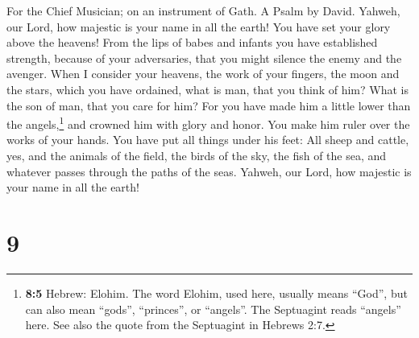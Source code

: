 For the Chief Musician; on an instrument of Gath. A Psalm by David.
 Yahweh, our Lord, how majestic is your name in all the
earth! You have set your glory above the heavens!  From
the lips of babes and infants you have established strength, because of
your adversaries, that you might silence the enemy and the avenger.
 When I consider your heavens, the work of your fingers,
the moon and the stars, which you have ordained,  what is
man, that you think of him? What is the son of man, that you care for
him?  For you have made him a little lower than the
angels,\footnote{\textbf{8:5} Hebrew: Elohim. The word Elohim, used
  here, usually means ``God'', but can also mean ``gods'', ``princes'',
  or ``angels''. The Septuagint reads ``angels'' here. See also the
  quote from the Septuagint in Hebrews 2:7.} and crowned him with glory
and honor.  You make him ruler over the works of your
hands. You have put all things under his feet:  All sheep
and cattle, yes, and the animals of the field,  the birds
of the sky, the fish of the sea, and whatever passes through the paths
of the seas.  Yahweh, our Lord, how majestic is your name
in all the earth!

\hypertarget{section-8}{%
\section{9}\label{section-8}}

